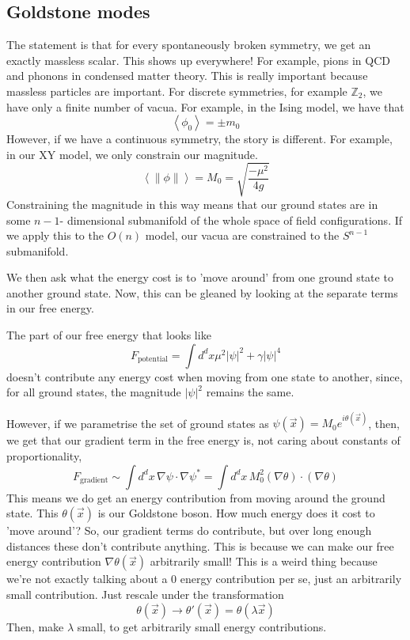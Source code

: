 \subsection{Goldstone modes} 
The statement is that for every spontaneously broken symmetry, 
we get an exactly massless scalar. This shows up everywhere! 
For example, pions in QCD and phonons in condensed matter theory. 
This is really important because massless particles are important. 
For discrete symmetries, for example $ \mathbb{ Z } _ 2 $, 
we have only a finite number of vacua. For example, in the Ising model, 
we have that 
\[
\left< \phi _ 0  \right>  = \pm m _ 0 
\] However, if we have a continuous symmetry, 
the story is different. For example, in our XY model, 
we only constrain our magnitude. 
\[
\left<   \|\phi \| \right> = M _ 0  = \sqrt{ \frac{ - \mu ^ 2 }{ 4 g }}  
\] Constraining the magnitude in this way means that 
our ground states are in some $ n  - 1 $- dimensional submanifold
of the whole space of field configurations. 
If we apply this to the $ O ( n ) $ model, 
our vacua are constrained to the $ S ^{ n - 1 }$ submanifold.

We then ask what the energy cost is to 'move around' 
from one ground state to another ground state. 
Now, this can be gleaned by looking at the separate terms 
in our free energy. 

The part of our free energy that looks like 
\[
F_{\text{potential}} = \int d ^ d x \mu ^ 2 | \psi |  ^ 2 + \gamma | \psi |^ 4 
\] doesn't contribute any energy cost when moving from 
one state to another, since, for all ground states, the magnitude 
 $ | \psi | ^ 2 $ remains the same. 

 However, if we parametrise the set of 
 ground states as $ \psi ( \vec{x} ) = M_0 e ^{  i \theta ( \vec{x} ) }$, 
 then, we get that our gradient term 
 in the free energy is, not caring about constants of proportionality, 
 \[
  F_{ \text{gradient} }  \sim \int d ^ d x \, 
  \nabla \psi \cdot  \nabla \psi ^ *  = \int d ^ d x \, 
  M _0 ^ 2 ( \nabla \theta ) \cdot  ( \nabla \theta ) 
 \] 
 This means we do get an energy contribution 
 from moving around the ground state. This $ \theta ( \vec{x} ) $ 
 is our Goldstone boson. 
How much energy does it cost to 'move around'?
So, our gradient terms do contribute, but
over long enough distances these don't contribute anything. 
This is because we can make our free energy contribution $  \nabla \theta ( \vec{x} ) $ 
arbitrarily small! This is a weird thing because 
we're not exactly talking about a 0 energy contribution per se,
just an arbitrarily small contribution. Just rescale under the 
 transformation 
\[
	\theta ( \vec{x} ) \to \theta ' ( \vec{x} ) = \theta ( \lambda \vec{x} ) 
\] Then, make $\lambda $ small, to 
get arbitrarily small energy contributions. 

